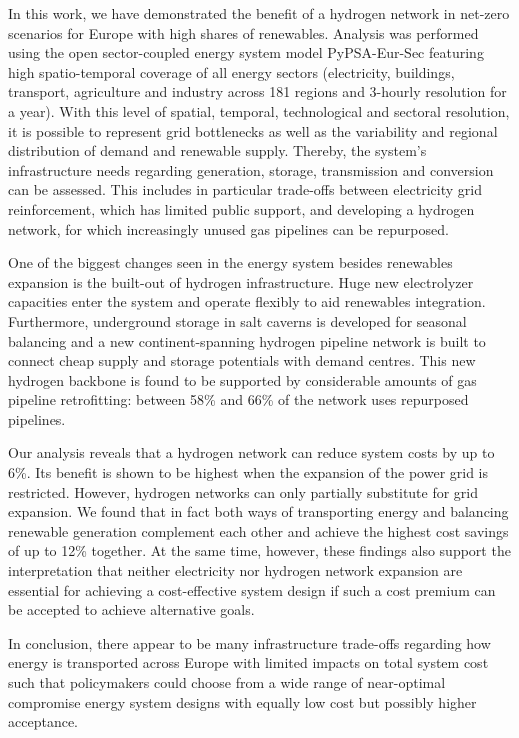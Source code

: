 In this work, we have demonstrated the benefit of a hydrogen network in net-zero
\co scenarios for Europe with high shares of renewables. Analysis was performed
using the open sector-coupled energy system model PyPSA-Eur-Sec featuring high
spatio-temporal coverage of all energy sectors (electricity, buildings,
transport, agriculture and industry across 181 regions and 3-hourly resolution
for a year). With this level of spatial, temporal, technological and sectoral
resolution, it is possible to represent grid bottlenecks as well as the
variability and regional distribution of demand and renewable supply. Thereby,
the system's infrastructure needs regarding generation, storage, transmission
and conversion can be assessed. This includes in particular trade-offs between
electricity grid reinforcement, which has limited public support, and developing
a hydrogen network, for which increasingly unused gas pipelines can be
repurposed.

One of the biggest changes seen in the energy system besides renewables
expansion is the built-out of hydrogen infrastructure. Huge new electrolyzer
capacities enter the system and operate flexibly to aid renewables integration.
Furthermore, underground storage in salt caverns is developed for seasonal
balancing and a new continent-spanning hydrogen pipeline network is built to
connect cheap supply and storage potentials with demand centres. This new
hydrogen backbone is found to be supported by considerable amounts of gas
pipeline retrofitting: between 58\% and 66\% of the network uses repurposed
pipelines.

Our analysis reveals that a hydrogen network can reduce system costs by up to
6\%. Its benefit is shown to be highest when the expansion of the power grid is
restricted. However, hydrogen networks can only partially substitute for grid
expansion. We found that in fact both ways of transporting energy and balancing
renewable generation complement each other and achieve the highest cost savings
of up to 12\% together. At the same time, however, these findings also support
the interpretation that neither electricity nor hydrogen network expansion are
essential for achieving a cost-effective system design if such a cost premium
can be accepted to achieve alternative goals.

In conclusion, there appear to be many infrastructure trade-offs regarding how
energy is transported across Europe with limited impacts on total system cost
such that policymakers could choose from a wide range of near-optimal compromise
energy system designs with equally low cost but possibly higher acceptance.

